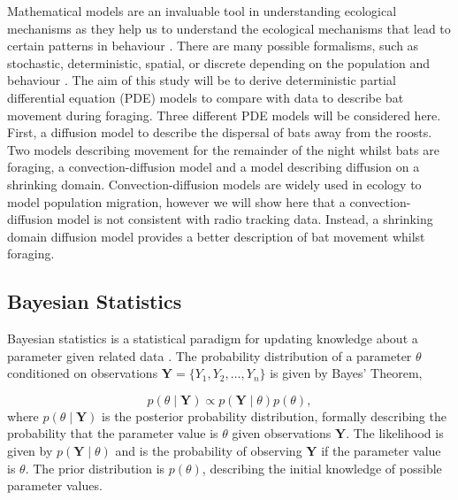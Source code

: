   Mathematical models are an
 invaluable tool in understanding
ecological
  mechanisms as they help us to
 understand the ecological mechanisms
that lead to certain patterns in behaviour
 \cite{Ovaskainen2016}. There are
many possible formalisms, such as stochastic,
 deterministic, spatial, or
discrete depending on the population and behaviour
 \cite{Murray2011}. The aim
of this study
  will be to derive deterministic
 partial differential equation
(PDE) models to compare with data to describe
  bat
 movement during foraging. Three different PDE models will be considered here. First, a diffusion model to describe the dispersal of bats away from the roosts. Two models describing movement for the remainder of the night whilst bats are foraging, a convection-diffusion model and a model describing diffusion on a shrinking domain. Convection-diffusion models are widely used in ecology to model population migration, however we will show here that a convection-diffusion model is not consistent with radio tracking data. Instead, a shrinking domain diffusion model provides a better description of bat movement whilst foraging.

 \subsection{Bayesian Statistics}
 Bayesian
statistics is a statistical
paradigm for updating knowledge about a
 parameter
given related data
\cite{Gelman2013}. The probability distribution of a
parameter
 $\theta$
conditioned on observations $\bm{Y} = \{ Y_1, Y_2, ..., Y_n
\}$ is
 given by
Bayes' Theorem,

 \begin{equation}
   p(\theta \mid \bm{Y})
\propto
p(\bm{Y} \mid \theta) p(\theta)
   \nonumber,
 \end{equation}
 where
$p(\theta \mid \bm{Y})$ is the posterior probability distribution, formally
describing the probability that the parameter value is $\theta$ given
observations $\bm{Y}$. The likelihood is given by $p(\bm{Y} \mid \theta)$ and
is the probability of observing $\bm{Y}$ if the parameter value is $\theta$.
The
 prior distribution is $p(\theta)$, describing the initial knowledge of
possible
 parameter values.

